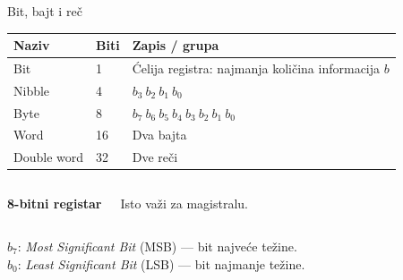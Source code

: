\begin{frame}[label=04-s023]{Bit, bajt i reč}
\par
{\fontsize{10}{12}\selectfont\renewcommand{\arraystretch}{1.0}\begin{tabularx}{\linewidth}{@{}llX@{}}\toprule
Naziv & Biti & Zapis / grupa\\\midrule
Bit & 1 & Ćelija registra: najmanja količina informacija $b$\\
Nibble & 4 & $b_3\ b_2\ b_1\ b_0$\\
Byte & 8 & $b_7\ b_6\ b_5\ b_4\ b_3\ b_2\ b_1\ b_0$\\
Word & 16 & Dva bajta\\
Double word & 32 & Dve reči\\\bottomrule
\end{tabularx}\par}\par\vspace{1mm}
\begin{columns}[c,onlytextwidth]
\centering\textbf{8-bitni registar}\par\vspace{1.5mm}
{\fontsize{10}{12}\selectfont\renewcommand{\arraystretch}{.95}\par}
\centering\alert{Isto važi za magistralu.}
\end{columns}
\par\vspace{1mm}
{\fontsize{10}{12}\selectfont
$b_7$: \textit{Most Significant Bit} (MSB) — bit najveće težine.\\
$b_0$: \textit{Least Significant Bit} (LSB) — bit najmanje težine.\par}
\end{frame}
